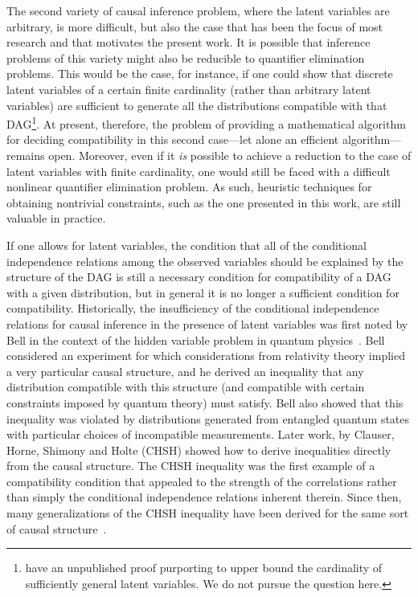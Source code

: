 The second variety of causal inference problem, where the latent variables are arbitrary, is more difficult, but also the case that has been the focus of most research and that motivates the present work. It is possible that inference problems of this variety might also be reducible to quantifier elimination problems. This would be the case, for instance, if one could show that discrete latent variables of a certain finite cardinality (rather than arbitrary latent variables) are sufficient to generate all the distributions compatible with that DAG\footnote{\citet{rosset2016finite} have an unpublished proof purporting to upper bound the cardinality of sufficiently general latent variables. We do not pursue the question here.}. At present, therefore, the problem of providing a mathematical algorithm for deciding compatibility in this second case---let alone an efficient algorithm---remains open.  Moreover, even if it {\em is} possible to achieve a reduction to the case of latent variables with finite cardinality, one would still be faced with a difficult nonlinear quantifier elimination problem.  As such, heuristic techniques for obtaining nontrivial constraints, such as the one presented in this work, are still valuable in practice. 

If one allows for latent variables, the condition that all of the conditional independence relations among the observed variables should be explained by the structure of the DAG is still a necessary condition for compatibility of a DAG with a given distribution, but in general it is no longer a sufficient condition for compatibility. Historically, the insufficiency of the conditional independence relations for causal inference in the presence of latent variables was first noted by Bell in the context of the hidden variable problem in quantum physics~\cite{bell1964einstein}. Bell considered an experiment for which considerations from relativity theory implied a very particular causal structure, and he derived an inequality that any distribution compatible with this structure (and compatible with certain constraints imposed by quantum theory) must satisfy.  Bell also showed that this inequality was violated by distributions generated from entangled quantum states with particular choices of incompatible measurements.
Later work, by Clauser, Horne, Shimony and Holte (CHSH) \cite{CHSHOriginal} showed how to derive inequalities directly from the causal structure.  The CHSH inequality was the first example of a compatibility condition that appealed to the strength of the correlations rather than simply the conditional independence relations inherent therein.  Since then, many generalizations of the CHSH inequality have been derived for the same sort of causal structure~\cite{Brunner2013Bell}.


